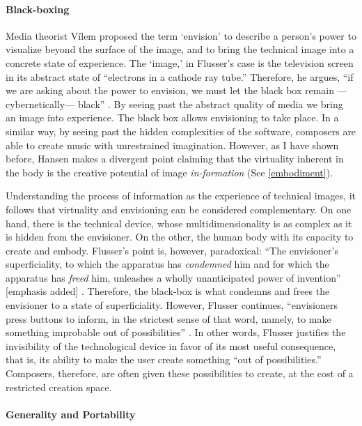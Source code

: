 \documentclass[
]{book}
\newcommand{\see}[1]{(See \ref{#1})}
\newcommand{\im}[0]{[emphasis added] }
\begin{document}
\paragraph{Black-boxing}

Media theorist Vílem \textcite{Flu11:Int} proposed the term `envision' to describe a person's power to visualize beyond the surface of the image, and to bring the technical image into a concrete state of experience. The `image,' in Flusser's case is the television screen in its abstract state of ``electrons in a cathode ray tube.'' Therefore, he argues, ``if we are asking about the power to envision, we must let the black box remain ---cybernetically--- black'' \parencite[35]{Flu11:Int}. By seeing past the abstract quality of media we bring an image into experience. The black box allows envisioning to take place. In a similar way, by seeing past the hidden complexities of the software, composers are able to create music with unrestrained imagination. However, as I have shown before, Hansen makes a divergent point claiming that the virtuality inherent in the body is the creative potential of image \textit{in-formation} \see{embodiment}. 

Understanding the process of information as the experience of technical images, it follows that virtuality and envisioning can be considered complementary. On one hand, there is the technical device, whose multidimensionality is as complex as it is hidden from the envisioner. On the other, the human body with its capacity to create and embody. Flusser's point is, however, paradoxical: ``The envisioner's superficiality, to which the apparatus has \textit{condemned} him and for which the apparatus has \textit{freed} him, unleashes a wholly unanticipated power of invention'' \im \parencite[37]{Flu11:Int}. Therefore, the black-box is what condemns and frees the envisioner to a state of superficiality. However, Flusser continues, ``envisioners press buttons to inform, in the strictest sense of that word, namely, to make something improbable out of possibilities'' \parencite[37]{Flu11:Int}. In other words, Flusser justifies the invisibility of the technological device in favor of its most useful consequence, that is, its ability to make the user create something ``out of possibilities.'' Composers, therefore, are often given these possibilities to create, at the cost of a restricted creation space.

\paragraph{Generality and Portability}
\label{computer:free}
\end{document}

